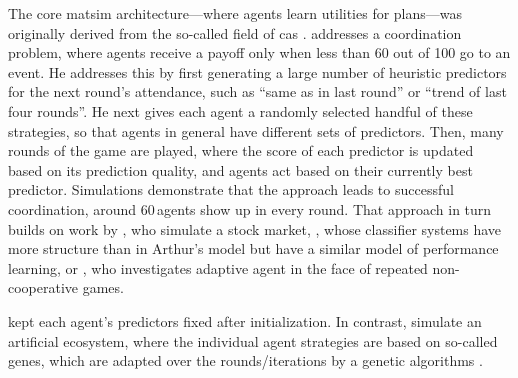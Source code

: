 The core \gls{matsim} architecture---where agents learn utilities for plans---was originally derived from the so-called field of \acrfull{cas} \citep[e.g.][]{AxelrodBook,Holland_1992,HraberJonesForrestEcho,PalmerEtAl_PhysicaD_1994}. 
%
\citet{ArthurBar} addresses a coordination problem, where agents receive a payoff only when less than 60 out of 100 go to an event.  He addresses this by first generating a large number of heuristic predictors for the next round's attendance, such as ``same as in last round'' or ``trend of last four rounds''.  He next gives each agent a randomly selected handful of these strategies, so that agents in general have different sets of predictors.  Then, many rounds of the game are played, where the score of each predictor is updated based on its prediction quality,  
and agents act based on their currently best predictor.  Simulations demonstrate that the approach leads to successful coordination, \ie around 60\,agents show up in every round.
%
That approach in turn builds on work by \cite{PalmerEtAl_PhysicaD_1994}, who simulate a stock market, \citet{Holland_1992}, whose classifier systems have more structure than in Arthur's model but have a similar model of performance learning, or \cite{AxelrodBook}, who investigates adaptive agent in the face of repeated non-cooperative games.  

\citet{ArthurBar} kept each agent's predictors fixed after initialization.  In contrast,
\citet{HraberJonesForrestEcho} simulate an artificial ecosystem, where the individual agent strategies are based on so-called genes, which are adapted over the rounds/iterations by a genetic algorithms \citep{Goldberg_1989}.

